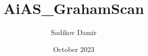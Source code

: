 

\title{AiAS\_GrahamScan}
\author{Sadikov Damir}
\date{October 2023}


	
	
	
	\large
	
	\tableofcontents
	\newpage
	
	
	
	
	
	
	
	
	
	
	

